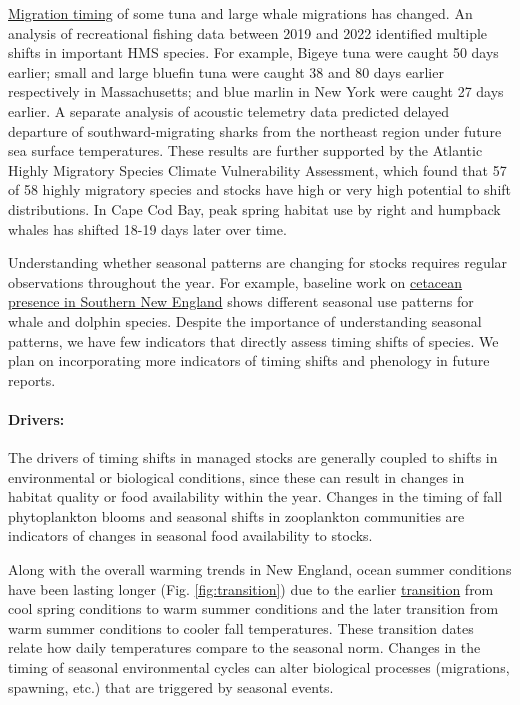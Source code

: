 \documentclass[
  10pt,
]{article}
\begin{document}
\newpage

\href{https://noaa-edab.github.io/catalog/timing_shifts.html}{Migration timing} of some tuna and large whale migrations has changed. An analysis of recreational fishing data between 2019 and 2022 identified multiple shifts in important HMS species. For example, Bigeye tuna were caught 50 days earlier; small and large bluefin tuna were caught 38 and 80 days earlier respectively in Massachusetts; and blue marlin in New York were caught 27 days earlier. A separate analysis of acoustic telemetry data predicted delayed departure of southward-migrating sharks from the northeast region under future sea surface temperatures. These results are further supported by the Atlantic Highly Migratory Species Climate Vulnerability Assessment, which found that 57 of 58 highly migratory species and stocks have high or very high potential to shift distributions. In Cape Cod Bay, peak spring habitat use by right and humpback whales has shifted 18-19 days later over time.

Understanding whether seasonal patterns are changing for stocks requires regular observations throughout the year. For example, baseline work on \href{https://noaa-edab.github.io/catalog/cetacean_acoustic.html}{cetacean presence in Southern New England} shows different seasonal use patterns for whale and dolphin species. Despite the importance of understanding seasonal patterns, we have few indicators that directly assess timing shifts of species. We plan on incorporating more indicators of timing shifts and phenology in future reports.

\paragraph{Drivers:}\label{drivers-1}

The drivers of timing shifts in managed stocks are generally coupled to shifts in environmental or biological conditions, since these can result in changes in habitat quality or food availability within the year. Changes in the timing of fall phytoplankton blooms and seasonal shifts in zooplankton communities are indicators of changes in seasonal food availability to stocks.

Along with the overall warming trends in New England, ocean summer conditions have been lasting longer (Fig. \ref{fig:transition}) due to the earlier \href{https://noaa-edab.github.io/catalog/trans_dates.html}{transition} from cool spring conditions to warm summer conditions and the later transition from warm summer conditions to cooler fall temperatures. These transition dates relate how daily temperatures compare to the seasonal norm. Changes in the timing of seasonal environmental cycles can alter biological processes (migrations, spawning, etc.) that are triggered by seasonal events.
\end{document}

